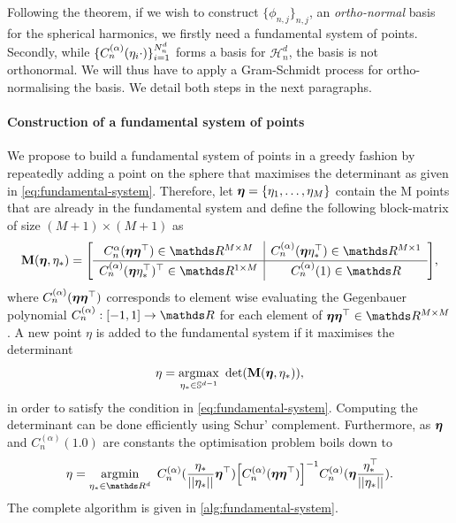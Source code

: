 Following the theorem, if we wish to construct $\{\phi_{n,j}\}_{n,j}$, an \emph{ortho-normal} basis for the spherical harmonics, we firstly need a fundamental system of points. Secondly, while $\{C_n^{(\alpha)}(\eta_i \cdot)\}_{i=1}^{N^d_n}$ forms a basis for $\mathcal{H}_n^d$, the basis is not orthonormal. We will thus have to apply a Gram-Schmidt process for ortho-normalising the basis. We detail both steps in the next paragraphs.

\paragraph{Construction of a fundamental system of points}
We propose to build a fundamental system of points in a greedy fashion by repeatedly adding a point on the sphere that maximises the determinant as given in \cref{eq:fundamental-system}. Therefore, let $\boldsymbol{\eta} = \{\eta_1, \ldots, \eta_M\}$ contain the M points that are already in the fundamental system and define the following block-matrix of size $(M+1) \times (M+1)$ as
\begin{equation}
    \renewcommand\arraystretch{1.3}
    \MM(\veta, \eta_{*}) =
    \left[
        \begin{array}{c|c}
          C_n^{\alpha}(\veta\veta\transpose) \in \Reals^{M \times M} & C_n^{(\alpha)}(\veta\eta_{*}\transpose) \in \Reals^{M \times 1} \\
          \hline
          C_n^{(\alpha)}(\veta\eta_{*}\transpose)\transpose \in \Reals^{1 \times M} & C_n^{(\alpha)}(1) \in \Reals
        \end{array}
    \right],
\end{equation}
where $C_n^{(\alpha)}(\boldsymbol{\eta}\boldsymbol{\eta}^{\top})$ corresponds to element wise evaluating the Gegenbauer polynomial $C_n^{(\alpha)}: [-1, 1] \rightarrow \Reals$ for each element of $\veta \veta\transpose \in \Reals^{M \times M}$. A new point $\eta$ is added to the fundamental system if it maximises the determinant
\begin{equation}
    \eta = \argmax_{\eta_* \in \dsphere}\ \textrm{det}\left(\MM(\veta, \eta_{*})\right),
\end{equation}
in order to satisfy the condition in \cref{eq:fundamental-system}.
Computing the determinant can be done efficiently using Schur' complement. Furthermore, as $\boldsymbol{\eta}$ and $C_n^{(\alpha)}(1.0)$ are constants the optimisation problem boils down to
\begin{equation}
    \label{eq:optimisation-determinant}
    \eta = \argmin_{\eta_* \in \Reals^d}\ C_n^{(\alpha)}(\frac{\eta_{*}}{\norm{\eta_*}}\veta\transpose) \left[C_n^{(\alpha)}(\veta\veta\transpose)\right]^{-1} C_n^{(\alpha)}(\veta\frac{\eta_{*}\transpose}{\norm{\eta_*}}).
\end{equation}
The complete algorithm is given in \cref{alg:fundamental-system}.


